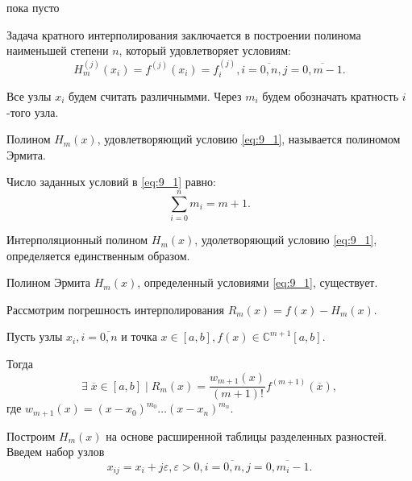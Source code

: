 \begin{col-answer-preambule}
	\begin{plan}
    \item пока пусто
	\end{plan}
\end{col-answer-preambule}


Задача кратного интерполирования заключается в построении полинома наименьшей степени $n$, который удовлетворяет условиям:
\begin{equation}\label{eq:9_1}
  H_m^{(j)}(x_i) = f^{(j)}(x_i) = f_i^{(j)}, i = \overline{0, n}, j = \overline{0, m - 1}.
\end{equation}

Все узлы $x_i$ будем считать различнымми. Через $m_i$ будем обозначать кратность $i$-того узла.

Полином $H_m(x)$, удовлетворяющий условию \eqref{eq:9_1}, называется полиномом Эрмита.

Число заданных условий в \eqref{eq:9_1} равно:
\begin{equation*}
  \sum\limits_{i=0}^n m_i = m + 1.
\end{equation*}

\begin{theorem}
  Интерполяционный полином $H_m(x)$, удолетворяющий условию \eqref{eq:9_1}, определяется единственным образом.
\end{theorem}

\begin{theorem}
  Полином Эрмита $H_m(x)$, определенный условиями \eqref{eq:9_1}, существует.
\end{theorem}

Рассмотрим погрешность интерполирования $R_m(x) = f(x) - H_m(x)$.

\begin{theorem}
  Пусть узлы $x_i, i = \overline{0, n}$ и точка $x \in [a, b], f(x) \in \mathbb{C}^{m + 1} [a, b]$.

  Тогда
  \begin{equation*}
    \exists \; \overline{x} \in [a, b] \; | \; R_m(x) = \dfrac{w_{m+1}(x)}{(m+1)!} f^{(m+1)}(\overline{x}),
  \end{equation*}
  где $w_{m+1}(x) = (x - x_0)^{m_0} \ldots (x - x_n)^{m_n}$.
\end{theorem}

Построим $H_m(x)$ на основе расширенной таблицы разделенных разностей. Введем набор узлов
\begin{equation*}
  x_{ij} = x_i + j \varepsilon, \varepsilon > 0, i = \overline{0, n}, j = \overline{0, m_i - 1}.
\end{equation*}

